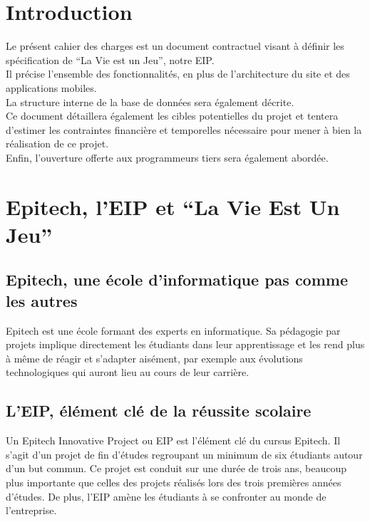 \documentclass{life-fr}
\begin{document}
\chapter{Introduction}

Le présent cahier des charges est un document contractuel visant à définir les
spécification de ``La Vie est un Jeu'', notre EIP.\\
Il précise l’ensemble des fonctionnalités, en plus de l’architecture du site et
des applications mobiles.\\
La structure interne de la base de données sera également décrite.\\
Ce document détaillera également les cibles potentielles du projet et tentera
d’estimer les contraintes financière et temporelles nécessaire pour mener à bien
la réalisation de ce projet.\\
Enfin, l’ouverture offerte aux programmeurs tiers sera également abordée.



\chapter{Epitech, l'EIP et ``La Vie Est Un Jeu''}

\section{Epitech, une école d'informatique pas comme les autres}

Epitech est une école formant des experts en informatique. Sa pédagogie par projets
implique directement les étudiants dans leur apprentissage et les rend plus à même
de réagir et s'adapter aisément, par exemple aux évolutions technologiques qui
auront lieu au cours de leur carrière.\\

\section{L'EIP, élément clé de la réussite scolaire}

Un Epitech Innovative Project ou EIP est l'élément clé du cursus Epitech. Il s'agit d'un projet de fin d'études regroupant un minimum de six étudiants autour d'un but commun. Ce projet est conduit sur une durée de trois ans, beaucoup plus importante que celles des projets réalisés lors des trois premières années d'études. De plus, l'EIP amène les étudiants à se confronter au monde de l'entreprise.
\end{document}

